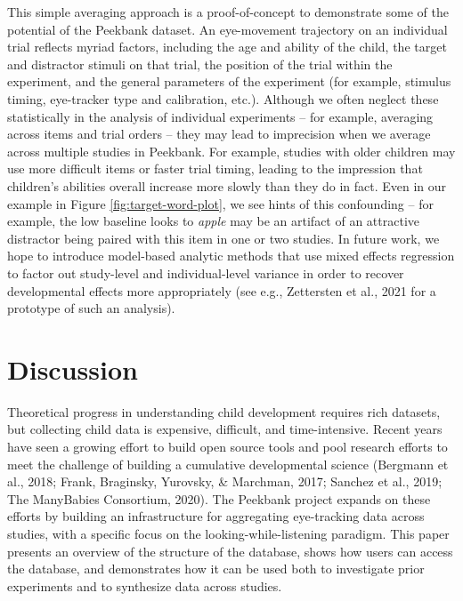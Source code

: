\documentclass[
  english,
  man,floatsintext]{apa6}
\begin{document}
This simple averaging approach is a proof-of-concept to demonstrate some of the potential of the Peekbank dataset.
An eye-movement trajectory on an individual trial reflects myriad factors, including the age and ability of the child, the target and distractor stimuli on that trial, the position of the trial within the experiment, and the general parameters of the experiment (for example, stimulus timing, eye-tracker type and calibration, etc.).
Although we often neglect these statistically in the analysis of individual experiments -- for example, averaging across items and trial orders -- they may lead to imprecision when we average across multiple studies in Peekbank.
For example, studies with older children may use more difficult items or faster trial timing, leading to the impression that children's abilities overall increase more slowly than they do in fact.
Even in our example in Figure \ref{fig:target-word-plot}, we see hints of this confounding -- for example, the low baseline looks to \emph{apple} may be an artifact of an attractive distractor being paired with this item in one or two studies.
In future work, we hope to introduce model-based analytic methods that use mixed effects regression to factor out study-level and individual-level variance in order to recover developmental effects more appropriately (see e.g., Zettersten et al., 2021 for a prototype of such an analysis).

\hypertarget{discussion}{%
\section{Discussion}\label{discussion}}

Theoretical progress in understanding child development requires rich datasets, but collecting child data is expensive, difficult, and time-intensive.
Recent years have seen a growing effort to build open source tools and pool research efforts to meet the challenge of building a cumulative developmental science (Bergmann et al., 2018; Frank, Braginsky, Yurovsky, \& Marchman, 2017; Sanchez et al., 2019; The ManyBabies Consortium, 2020).
The Peekbank project expands on these efforts by building an infrastructure for aggregating eye-tracking data across studies, with a specific focus on the looking-while-listening paradigm.
This paper presents an overview of the structure of the database, shows how users can access the database, and demonstrates how it can be used both to investigate prior experiments and to synthesize data across studies.
\end{document}
